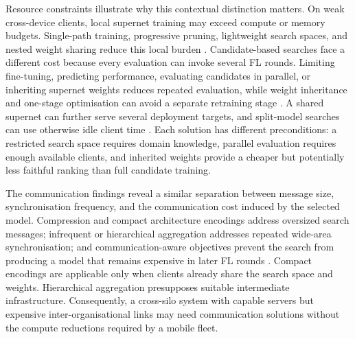 Resource constraints illustrate why this contextual distinction matters. On weak cross-device clients, local supernet training may exceed compute or memory budgets. Single-path training, progressive pruning, lightweight search spaces, and nested weight sharing reduce this local burden \cite{dfnas_2020,peaches_2024,load_monitoring_fednas_2025}. Candidate-based searches face a different cost because every evaluation can invoke several FL rounds. Limiting fine-tuning, predicting performance, evaluating candidates in parallel, or inheriting supernet weights reduces repeated evaluation, while weight inheritance and one-stage optimisation can avoid a separate retraining stage \cite{decnas_2022,hapfnas_2025,medical_image_segmentation_fednas_2024}. A shared supernet can further serve several deployment targets, and split-model searches can use otherwise idle client time \cite{superfednas_2024,nasfly_2024}. Each solution has different preconditions: a restricted search space requires domain knowledge, parallel evaluation requires enough available clients, and inherited weights provide a cheaper but potentially less faithful ranking than full candidate training.

The communication findings reveal a similar separation between message size, synchronisation frequency, and the communication cost induced by the selected model. Compression and compact architecture encodings address oversized search messages; infrequent or hierarchical aggregation addresses repeated wide-area synchronisation; and communication-aware objectives prevent the search from producing a model that remains expensive in later FL rounds \cite{fedregnas_2025,finch_2024,multi_objective_evo_fl_2020}. Compact encodings are applicable only when clients already share the search space and weights. Hierarchical aggregation presupposes suitable intermediate infrastructure. Consequently, a cross-silo system with capable servers but expensive inter-organisational links may need communication solutions without the compute reductions required by a mobile fleet.

